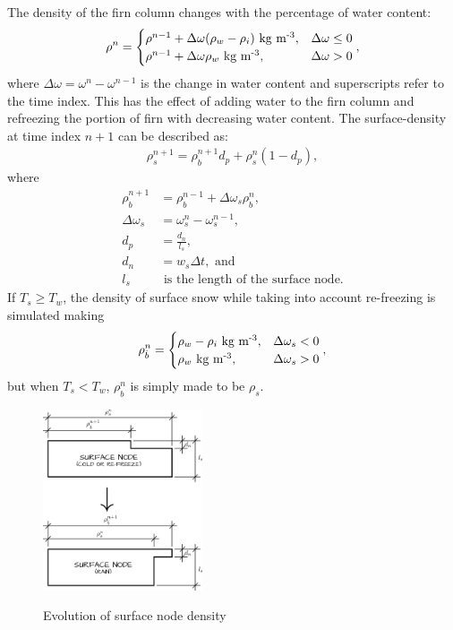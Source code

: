 \documentclass{article}%
\newcommand{\sups}[1]{\ensuremath{^{\textrm{#1}}}}
\begin{document}
The density of the firn column changes with the percentage of water content:
\begin{align*}
  \rho^n = 
  \begin{cases}
    \rho^{n-1} + \Delta\omega(\rho_w - \rho_i)\ \text{kg m\sups{-3}},  
      &\Delta\omega \leq 0\\
    \rho^{n-1} + \Delta\omega\rho_w\ \text{kg m\sups{-3}}, 
      &\Delta\omega > 0
  \end{cases},
\end{align*}
where $\Delta\omega = \omega^n - \omega^{n-1}$ is the change in water content and superscripts refer to the time index.  This has the effect of adding water to the firn column and refreezing the portion of firn with decreasing water content.  The surface-density at time index $n+1$ can be described as: 
\begin{align*}
  \rho_s^{n+1} = \rho_{\dot{b}}^{n+1} d_p + \rho_s^{n} (1 - d_p),
\end{align*}
where
\begin{align*}
  \rho_{\dot{b}}^{n+1} &= \rho_{\dot{b}}^{n-1} + \Delta \omega_s \rho_{\dot{b}}^n,\\
  \Delta \omega_s &= \omega_s^{n} - \omega_s^{n-1},\\
  d_p &= \frac{d_n}{l_s},\\
  d_n &= w_s\Delta t,\text{ and}\\
  l_s &\text{ is the length of the surface node.}
\end{align*}
If $T_s \geq T_w$, the density of surface snow while taking into account re-freezing is simulated making
\begin{align*}
  \rho_{\dot{b}}^n = 
  \begin{cases}
    \rho_w - \rho_i\ \text{kg m\sups{-3}},  &\Delta\omega_s < 0\\
    \rho_w\ \text{kg m\sups{-3}}, &\Delta\omega_s > 0
  \end{cases},
\end{align*}
but when $T_s < T_w$, $\rho_{\dot{b}}^n$ is simply made to be $\rho_s$.
\begin{figure}[H]
	\centering
		\includegraphics[width=0.42\textwidth]{images/surfaceDensity.png}
	\label{fig:500 year orbit}
	\caption{Evolution of surface node density}
\end{figure}
\end{document}
